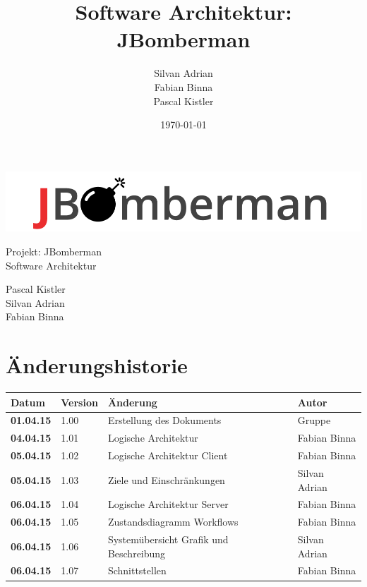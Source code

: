 \documentclass[11pt]{scrartcl}
\title{Software Architektur: JBomberman}
\author{Silvan Adrian \\ Fabian Binna \\ Pascal Kistler}
\date{\today{}}
\begin{document}
\def\arraystretch{1.5}
\begin{titlepage}
\begin{center}
\vspace{10em}
\includegraphics[scale=2]{jbomberman}
\vspace{10em}
\end{center}
\begin{center}
\huge {Projekt: JBomberman} \\
\huge {Software Architektur}
\end{center}
\begin{center}
\vspace{10em}
\LARGE {Pascal Kistler} \\
\LARGE {Silvan Adrian} \\
\LARGE {Fabian Binna}
\end{center}

\end{titlepage}

\newpage
\section{Änderungshistorie}
\label{sec:Änderungen}

\begin{tabularx}{\linewidth}{l l l l}
\textbf{Datum} & \textbf{Version} & \textbf{Änderung}  & \textbf{Autor} \\
\hline
\textbf{01.04.15} & 1.00 & Erstellung des Dokuments & Gruppe \\
\textbf{04.04.15} & 1.01 & Logische Architektur & Fabian Binna \\
\textbf{05.04.15} & 1.02 & Logische Architektur Client & Fabian Binna\\
\textbf{05.04.15} & 1.03 & Ziele und Einschränkungen & Silvan Adrian\\
\textbf{06.04.15} & 1.04 & Logische Architektur Server & Fabian Binna\\
\textbf{06.04.15} & 1.05 & Zustandsdiagramm Workflows & Fabian Binna\\
\textbf{06.04.15} & 1.06 & Systemübersicht Grafik und Beschreibung & Silvan Adrian\\
\textbf{06.04.15} & 1.07 & Schnittstellen & Fabian Binna\\
\end{tabularx}
\end{document}
